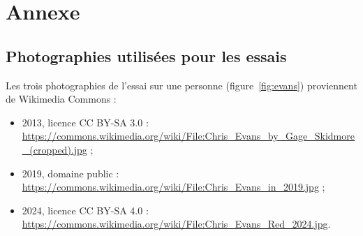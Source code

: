 \chapter*{Annexe}\label{annexe1}
\begin{nouv}
\section*{Photographies utilisées pour les essais}

Les trois photographies de l'essai sur une personne (figure~\ref{fig:evans}) proviennent de Wikimedia Commons :
\begin{itemize}
  \item 2013, licence CC BY-SA 3.0 : \url{https://commons.wikimedia.org/wiki/File:Chris_Evans_by_Gage_Skidmore_(cropped).jpg} ;
  \item 2019, domaine public : \url{https://commons.wikimedia.org/wiki/File:Chris_Evans_in_2019.jpg} ;
  \item 2024, licence CC BY-SA 4.0 : \url{https://commons.wikimedia.org/wiki/File:Chris_Evans_Red_2024.jpg}.
\end{itemize}
\end{nouv}
